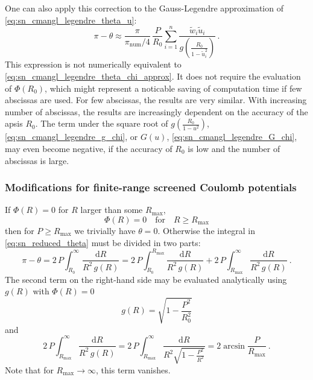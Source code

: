 One can also apply this correction to the Gauss-Legendre approximation of \cref{eq:sn_cmangl_legendre_theta_u}:
%
\begin{equation*}
    \pi - \theta \approx
        \frac{ \pi }{ \pi_\mathrm{num}/4 } \, \frac{ P }{ R_0 }
        \sum_{i=1}^n
        \frac{ \tilde{w}_i \tilde{u}_i
        }{ g \left( \frac{ R_0 }{ 1-\tilde{u}_i^2 } \right) } \, .
\end{equation*}
%
This expression is not numerically equivalent to \cref{eq:sn_cmangl_legendre_theta_chi_approx}.
It does not require the evaluation of \(\Phi(R_0)\), which might represent a noticable saving of computation time if few abscissas are used.
For few abscissas, the results are very similar.
With increasing number of abscissas, the results are increasingly dependent on the accuracy of the apsis \(R_0\).
The term under the square root of $g(\frac{R_0}{1-u^2})$, \cref{eq:sn_cmangl_legendre_g_chi}, or $G(u)$, \cref{eq:sn_cmangl_legendre_G_chi}, may even become negative, if the accuracy of \(R_0\) is low and the number of abscissas is large.

\subsubsection{Modifications for finite-range screened Coulomb potentials}
%
If $\Phi(R) = 0$ for $R$ larger than some $R_\mathrm{max}$,
%
\begin{equation}
    \Phi(R) = 0 \quad \text{for} \quad R \ge R_\mathrm{max}
\end{equation}
%
then for $P \ge R_\mathrm{max}$ we trivially have $\theta = 0$.
Otherwise the integral in \cref{eq:sn_reduced_theta} must be divided in two parts:
%
\begin{equation}
    \label{eq:sn_reduced_theta_finite}
    \pi - \theta =
        2 \, P \int_{R_0}^\infty \frac{ \mathrm{d}R }{ R^2 \, g(R) } =
        2 \, P \int_{R_0}^{R_\mathrm{max}} \frac{ \mathrm{d}R }{ R^2 \, g(R) } +
        2 \, P \int_{R_\mathrm{max}}^{\infty} \frac{ \mathrm{d}R }{ R^2 \, g(R) } ~.
\end{equation}
%
The second term on the right-hand side may be evaluated analytically using $g(R)$ with $\Phi(R) = 0$
%
\begin{equation}
    \label{eq:sn_g_phi=0}
    g(R) = \sqrt{ 1 - \frac{ P^2 }{ R_0^2 }}
\end{equation}
%
and \cite[2.275.4]{Gra80}
%
\begin{equation}
    \label{eq:sn_reduced_theta_finite_2}
    2 \, P \int_{R_\mathrm{max}}^{\infty} \frac{ \mathrm{d}R }{ R^2 \, g(R) } =
        2 \, P \int_{R_\mathrm{max}}^{\infty}
            \frac{ \mathrm{d}R }{ R^2 \sqrt{ 1 - \frac{P^2}{R^2}} } =
        2 \arcsin \frac{P}{R_\mathrm{max}} ~.
\end{equation}
%
Note that for $R_\mathrm{max} \rightarrow \infty$, this term vanishes.

